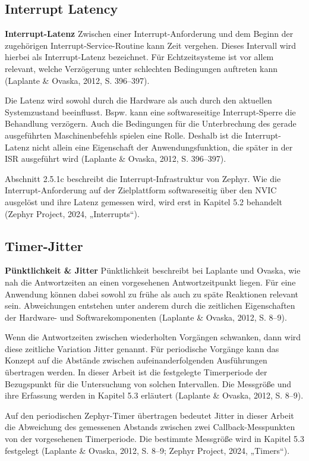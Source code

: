 \subsection{Interrupt Latency}
\textbf{Interrupt-Latenz }Zwischen einer Interrupt-Anforderung und dem Beginn der zugehörigen Interrupt-Service-Routine kann Zeit vergehen. Dieses Intervall wird hierbei als Interrupt-Latenz bezeichnet. Für Echtzeitsysteme ist vor allem relevant, welche Verzögerung unter schlechten Bedingungen auftreten kann (Laplante \& Ovaska, 2012, S. 396–397).

Die Latenz wird sowohl durch die Hardware als auch durch den aktuellen Systemzustand beeinflusst. Bspw. kann eine softwareseitige Interrupt-Sperre die Behandlung verzögern. Auch die Bedingungen für die Unterbrechung des gerade ausgeführten Maschinenbefehls spielen eine Rolle. Deshalb ist die Interrupt-Latenz nicht allein eine Eigenschaft der Anwendungsfunktion, die später in der ISR ausgeführt wird (Laplante \& Ovaska, 2012, S. 396–397).

Abschnitt 2.5.1c beschreibt die Interrupt-Infrastruktur von Zephyr. Wie die Interrupt-Anforderung auf der Zielplattform softwareseitig über den NVIC ausgelöst und ihre Latenz gemessen wird, wird erst in Kapitel 5.2 behandelt (Zephyr Project, 2024, „Interrupts“).

\subsection{Timer-Jitter}
\textbf{Pünktlichkeit \& Jitter }Pünktlichkeit beschreibt bei Laplante und Ovaska, wie nah die Antwortzeiten an einen vorgesehenen Antwortzeitpunkt liegen. Für eine Anwendung können dabei sowohl zu frühe als auch zu späte Reaktionen relevant sein. Abweichungen entstehen unter anderem durch die zeitlichen Eigenschaften der Hardware- und Softwarekomponenten (Laplante \& Ovaska, 2012, S. 8–9).

Wenn die Antwortzeiten zwischen wiederholten Vorgängen schwanken, dann wird diese zeitliche Variation Jitter genannt. Für periodische Vorgänge kann das Konzept auf die Abstände zwischen aufeinanderfolgenden Ausführungen übertragen werden. In dieser Arbeit ist die festgelegte Timerperiode der Bezugspunkt für die Untersuchung von solchen Intervallen. Die Messgröße und ihre Erfassung werden in Kapitel 5.3 erläutert (Laplante \& Ovaska, 2012, S. 8–9).

Auf den periodischen Zephyr-Timer übertragen bedeutet Jitter in dieser Arbeit die Abweichung des gemessenen Abstands zwischen zwei Callback-Messpunkten von der vorgesehenen Timerperiode. Die bestimmte Messgröße wird in Kapitel 5.3 festgelegt (Laplante \& Ovaska, 2012, S. 8–9; Zephyr Project, 2024, „Timers“).

